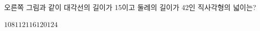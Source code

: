 \noindent\begin{minipage}[t]{0.58\linewidth}\vspace{0pt}\raggedright 오른쪽 그림과 같이 대각선의 길이가 15이고 둘레의 길이가 42인 직사각형의 넓이는?\end{minipage}\hfill\begin{minipage}[t]{0.4\linewidth}\vspace{0pt}\centering \resizebox{\ifdim\width>\linewidth\linewidth\else\width\fi}{!}{}\end{minipage}\par
\begin{choices32}{$108$}{$112$}{$116$}{$120$}{$124$}\end{choices32}
